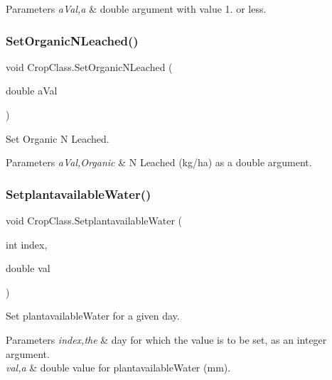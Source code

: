 \begin{DoxyParams}{Parameters}
{\em a\+Val,a} & double argument with value 1. or less. \\
\hline
\end{DoxyParams}
\mbox{\label{class_crop_class_a0c446a2a77172db039813777251ada6e}} 
\subsubsection{\texorpdfstring{SetOrganicNLeached()}{SetOrganicNLeached()}}
{\footnotesize\ttfamily void Crop\+Class.\+Set\+Organic\+N\+Leached (\begin{DoxyParamCaption}\item[{double}]{a\+Val }\end{DoxyParamCaption})\hspace{0.3cm}{\ttfamily [inline]}}



Set Organic N Leached. 


\begin{DoxyParams}{Parameters}
{\em a\+Val,Organic} & N Leached (kg/ha) as a double argument. \\
\hline
\end{DoxyParams}
\mbox{\label{class_crop_class_adceae8d43466fbdb1a1de452ad986e76}} 
\subsubsection{\texorpdfstring{SetplantavailableWater()}{SetplantavailableWater()}}
{\footnotesize\ttfamily void Crop\+Class.\+Setplantavailable\+Water (\begin{DoxyParamCaption}\item[{int}]{index,  }\item[{double}]{val }\end{DoxyParamCaption})\hspace{0.3cm}{\ttfamily [inline]}}



Set plantavailable\+Water for a given day. 


\begin{DoxyParams}{Parameters}
{\em index,the} & day for which the value is to be set, as an integer argument. \\
\hline
{\em val,a} & double value for plantavailable\+Water (mm). \\
\hline
\end{DoxyParams}
\mbox{\label{class_crop_class_aaea27372e056e9595593e0757fda4ecb}} 
